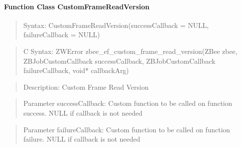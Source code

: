 \paragraph{Function Class CustomFrameReadVersion}
\begin{quote}Syntax: CustomFrameReadVersion(successCallback = NULL, failureCallback = NULL)\end{quote}
\begin{quote}C Syntax: ZWError zbee\_ef\_custom\_frame\_read\_version(ZBee zbee, ZBJobCustomCallback successCallback, ZBJobCustomCallback failureCallback, void* callbackArg)\end{quote}
\begin{quote}Description: Custom Frame Read Version\end{quote}
\begin{quote}Parameter successCallback: Custom function to be called on function success. NULL if callback is not needed\end{quote}
\begin{quote}Parameter failureCallback: Custom function to be called on function failure. NULL if callback is not needed\end{quote}


